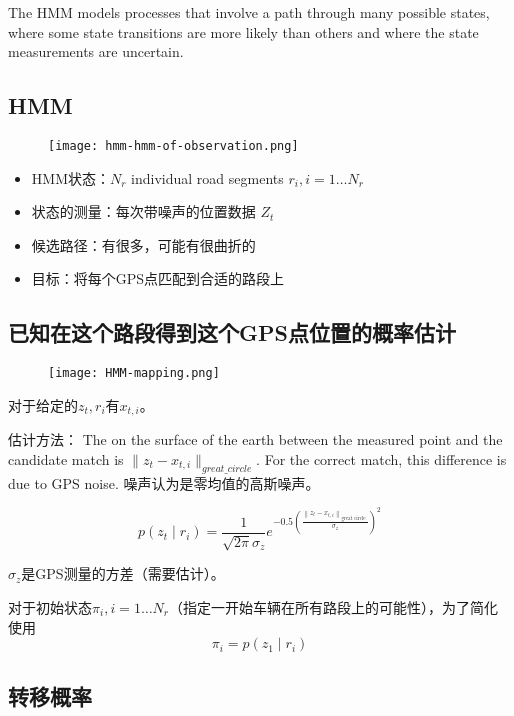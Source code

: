 The HMM models processes that involve a path through many
possible states, where some state transitions are more likely than
others and where the state measurements are uncertain.

\subsection{HMM}

\begin{figure}[h]
    \centering
    \texttt{[image: hmm-hmm-of-observation.png]}
\end{figure}

\begin{itemize}
    \item HMM状态：$ N_{r} $ individual  road  segments $ r_{i},  i=1 \ldots N_{r} $
    \item 状态的测量：每次带噪声的位置数据 $ Z_{t} $
    \item 候选路径：有很多，可能有很曲折的
    \item 目标：将每个GPS点匹配到合适的路段上
\end{itemize}

\subsection{已知在这个路段得到这个GPS点位置的概率估计}

\begin{figure}[h]
    \centering
    \texttt{[image: HMM-mapping.png]}
\end{figure}

对于给定的$z_{t},r_{i} $有$ x_{t, i}$。

估计方法：
The  on the surface of the earth between the measured point and the candidate match is $ \| z_{t}- x_{t, i} \|_{great\_circle}$. For the correct match, this difference is due to GPS noise. 噪声认为是零均值的高斯噪声。

$$ p\left(z_{t} \mid r_{i}\right)=\frac{1}{\sqrt{2 \pi} \sigma_{z}} e^{-0.5\left(\frac{\left\|z_{t}-x_{t, i}\right\|_{\text {great circle }}}{\sigma_{z}}\right)^{2}} $$

$\sigma_{z}$是GPS测量的方差（需要估计）。

对于初始状态$ \pi_{i} ,i=1 \ldots N_{r} $（指定一开始车辆在所有路段上的可能性），为了简化使用$$ \pi_{i}=p\left(z_{1} \mid r_{i}\right) $$

\subsection{转移概率}


